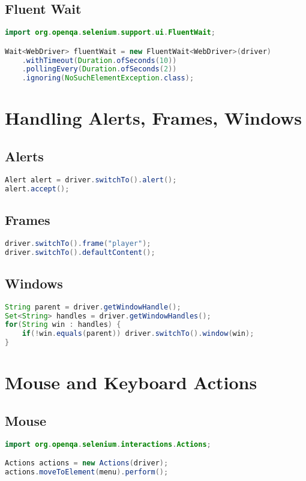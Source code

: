 \documentclass[a4paper,12pt]{article}
\begin{document}
\subsection{Fluent Wait}
\begin{lstlisting}[language=Java]
import org.openqa.selenium.support.ui.FluentWait;

Wait<WebDriver> fluentWait = new FluentWait<WebDriver>(driver)
    .withTimeout(Duration.ofSeconds(10))
    .pollingEvery(Duration.ofSeconds(2))
    .ignoring(NoSuchElementException.class);
\end{lstlisting}

\section{Handling Alerts, Frames, Windows}

\subsection{Alerts}
\begin{lstlisting}[language=Java]
Alert alert = driver.switchTo().alert();
alert.accept();
\end{lstlisting}

\subsection{Frames}
\begin{lstlisting}[language=Java]
driver.switchTo().frame("player");
driver.switchTo().defaultContent();
\end{lstlisting}

\subsection{Windows}
\begin{lstlisting}[language=Java]
String parent = driver.getWindowHandle();
Set<String> handles = driver.getWindowHandles();
for(String win : handles) {
    if(!win.equals(parent)) driver.switchTo().window(win);
}
\end{lstlisting}

\section{Mouse and Keyboard Actions}

\subsection{Mouse}
\begin{lstlisting}[language=Java]
import org.openqa.selenium.interactions.Actions;

Actions actions = new Actions(driver);
actions.moveToElement(menu).perform();
\end{lstlisting}
\end{document}
